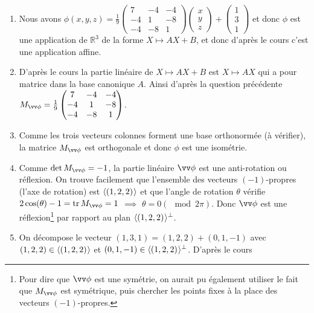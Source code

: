 \documentclass[a4paper,12pt,reqno]{amsart}
\begin{document}
\begin{solution}

  \begin{enumerate}
    \item Nous avons $\phi(x,y,z) = \frac{1}{9}
          \begin{pmatrix}
             7 & -4 & -4 \\
            -4 &  1 & -8 \\
            -4 & -8 &  1
          \end{pmatrix}
          \begin{pmatrix} x\\ y\\ z\end{pmatrix}
          +
          \begin{pmatrix} 1\\ 3\\ 1\end{pmatrix}
        $ et donc $\phi$ est une application de $\mathbb{R}^{3}$ de la forme $X\mapsto AX+B$, et donc d'après le cours c'est une application affine.
    \item D'après le cours la partie linéaire de $X\mapsto AX+B$ est $X\mapsto AX$ qui a pour matrice dans la base canonique $A$. Ainsi d'après la question précédente $M_{\vv\phi} = \frac{1}{9}
          \begin{pmatrix}
             7 & -4 & -4 \\
            -4 &  1 & -8 \\
            -4 & -8 &  1
          \end{pmatrix}
          $.
    \item Comme les trois vecteurs colonnes forment une base orthonormée (à vérifier), la matrice $M_{\vv\phi}$ est orthogonale et donc $\phi$ est une isométrie.
    \item Comme $\det M_{\vv\phi} = -1$, la partie linéaire $\vv\phi$ est une anti-rotation ou réflexion. On trouve facilement que l'ensemble des vecteurs $(-1)$-propres (l'axe de rotation) est $\langle{(1,2,2)}\kern.07em\rangle$ et que l'angle de rotation $\theta$ vérifie $2\cos(\theta)-1 = \tr M_{\vv\phi} = 1$ $\implies$ $\theta = 0 (\mod 2\pi)$. Donc $\vv\phi$ est une réflexion\footnote{Pour dire que $\vv\phi$ est une symétrie, on aurait pu également utiliser le fait que $M_{\vv\phi}$ est symétrique, puis chercher les points fixes à la place des vecteurs $(-1)$-propres.} par rapport au plan $\langle{(1,2,2)}\kern.07em\rangle^{\perp}$.
    \item On décompose le vecteur $(1,3,1) = (1,2,2)+(0,1,-1)$ avec $(1,2,2) \in \langle{(1,2,2)}\kern.07em\rangle$ et $(0,1,-1) \in \langle{(1,2,2)}\kern.07em\rangle^{\perp}$. D'après le cours

\end{enumerate}
\end{solution}
\end{document}
